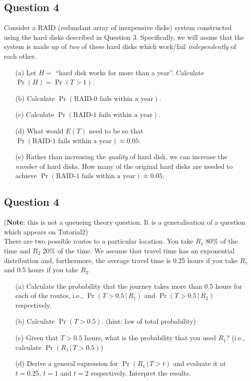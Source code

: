\subsection*{Question 4}
Consider a RAID (redundant array of inexpensive disks) system constructed using the hard disks described in Question 3. Specifically, we will assme that the system is made up of \emph{two} of these hard disks which work/fail \emph{independently} of each other.\\[-0.2cm]
\begin{itemize}
\item[(a)] Let $H =$  ``hard disk works for more than a year''. Calculate $\Pr(H) = \Pr(T > 1)$.  \\\item[(b)] Calculate $\Pr(\text{RAID-0 fails within a year})$.  \item[(c)] Calculate $\Pr(\text{RAID-1 fails within a year})$.   \item[(d)] What would $E(T)$ need to be so that $\Pr(\text{RAID-1 fails within a year}) \approx 0.05$.  \item[(e)] Rather than increasing the \emph{quality} of hard disk, we can increase the \emph{number} of hard disks. How many of the original hard disks are needed to achieve $\Pr(\text{RAID-1 fails within a year}) \approx 0.05$.
\end{itemize}



\subsection*{Question 4}
{\footnotesize({\bf Note}: this is not a queueing theory question. It is a generalisation of a question which appears on Tutorial2)}\\[0.1cm]
There are two possible routes to a particular location. You take $R_1$ 80\% of the time and $R_2$ 20\% of the time. We assume that travel time has an exponential distribution and, furthermore, the average travel time is 0.25 hours if you take $R_1$ and 0.5 hours if you take $R_2$.\\[-0.2cm]

\begin{itemize}
\item[(a)] Calculate the probability that the journey takes more than 0.5 hours for each of the routes, i.e., $\Pr(T > 0.5\,|\,R_1)$ and $\Pr(T > 0.5\,|\,R_2)$ respectively.  \item[(b)] Calculate $\Pr(T > 0.5)$. (hint: law of total probability)  \item[(c)] Given that $T>0.5$ hours, what is the probability that you used $R_1$? (i.e., calculate $\Pr(R_1\,|\,T>0.5)$)  \item[(d)] Derive a general expression for $\Pr(R_1\,|\,T>t)$ and evaluate it at $t=0.25$, $t = 1$ and $t = 2$ respectively. Interpret the results.
\end{itemize}

